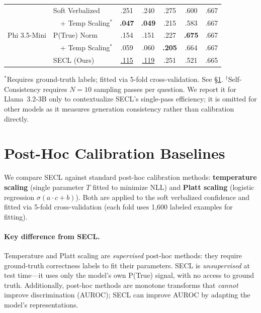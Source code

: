 \begin{table}[h]
\begin{tabular}{@{}llccccc@{}}
\multirow{5}{*}{Phi 3.5-Mini}
  & Soft Verbalized     & .251 & .240 & .275 & .600 & .667 \\
  & ~~+ Temp Scaling$^*$ & \textbf{.047} & \textbf{.049} & .215 & .583 & .667 \\
  & P(True) Norm        & .154 & .151 & .227 & \textbf{.675} & .667 \\
  & ~~+ Temp Scaling$^*$ & .059 & .060 & \textbf{.205} & .664 & .667 \\
  & SECL (Ours)         & \underline{.115} & \underline{.119} & .251 & .521 & .665 \\
\bottomrule
\end{tabular}
\vspace{0.3em}
\newline
{\footnotesize $^*$Requires ground-truth labels; fitted via 5-fold cross-validation. See \S\ref{app:posthoc}.}
\newline
{\footnotesize $^\dagger$Self-Consistency requires $N{=}10$ sampling
passes per question. We report it for Llama~3.2-3B only to
contextualize SECL's single-pass efficiency; it is omitted for
other models as it measures generation consistency rather than
calibration directly.}
\end{table}


\section{Post-Hoc Calibration Baselines} \label{app:posthoc}

We compare SECL against standard post-hoc calibration methods:
\textbf{temperature scaling} \citep{guo_calibration_2017} (single parameter $T$
fitted to minimize NLL) and \textbf{Platt scaling} \citep{platt_probabilistic_1999}
(logistic regression $\sigma(a \cdot c + b)$).
Both are applied to the soft verbalized confidence and fitted via 5-fold 
cross-validation (each fold uses 1{,}600 labeled examples for fitting).

\paragraph{Key difference from SECL.}
Temperature and Platt scaling are \emph{supervised} post-hoc methods:
they require ground-truth correctness labels to fit their parameters.
SECL is \emph{unsupervised} at test time---it uses only the model's own 
P(True) signal, with no access to ground truth.
Additionally, post-hoc methods are monotone transforms that 
\emph{cannot} improve discrimination (AUROC);
SECL can improve AUROC by adapting the model's representations.

